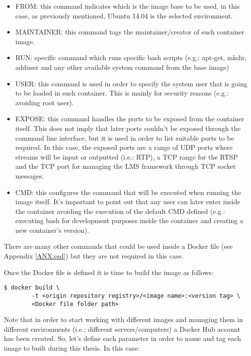 \begin{itemize}
\item FROM: this command indicates which is the image base to be used, in this case, as previously mentioned, Ubuntu 14.04 is the selected environment.
\item MAINTAINER: this command tags the maintainer/creator of such container image.
\item RUN: specific command which runs specific bash scripts (e.g.: apt-get, mkdir, adduser and any other available system command from the base image)
\item USER: this command is used in order to specify the system user that is going to be loaded in such container. This is mainly for security reasons (e.g.: avoiding root user).
\item EXPOSE: this command handles the ports to be exposed from the container itself. This does not imply that later ports couldn't be exposed through the command line interface, but it is used in order to list suitable ports to be required. In this case, the exposed ports are a range of UDP ports where streams will be input or outputted (i.e.: RTP), a TCP range for the RTSP and the TCP port for managing the LMS framework through TCP socket messages. 
\item CMD: this configures the command that will be executed when running the image itself. It's important to point out that any user can later enter inside the container avoiding the execution of the default CMD defined (e.g.: executing bash for development purposes inside the container and creating a new container's version).
\end{itemize}

There are many other commands that could be used inside a Docker file (see Appendix \ref{ANX:csd}) but they are not required in this case.

Once the Docker file is defined it is time to build the image as follows:

\begin{verbatim}
$ docker build \
		-t <origin repository registry>/<image name>:<version tag> \
		<Docker file folder path>
\end{verbatim}

Note that in order to start working with different images and managing them in different environments (i.e.: different servers/computers) a Docker Hub account has been created. So, let's define each parameter in order to name and tag each image to built during this thesis. In this case:

